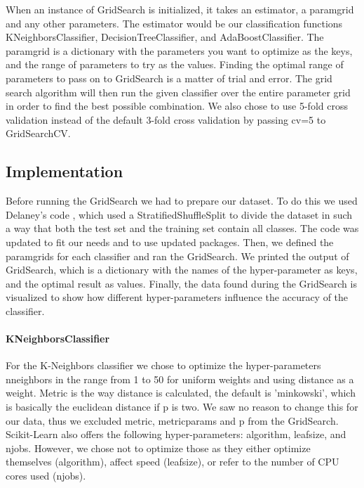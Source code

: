 \documentclass{article}
\begin{document}
	When an instance of GridSearch is initialized, it takes an estimator, a param\textunderscore grid and any other parameters. The estimator would be our classification functions KNeighborsClassifier, DecisionTreeClassifier, and AdaBoostClassifier. The param\textunderscore grid is a dictionary with the parameters you want to optimize as the keys, and the range of parameters to try as the values. Finding the optimal range of parameters to pass on to GridSearch is a matter of trial and error. The grid search algorithm will then run the given classifier over the entire parameter grid in order to find the best possible combination. We also chose to use 5-fold cross validation instead of the default 3-fold cross validation by passing cv=5 to GridSearchCV. 

	\subsection{Implementation}
		Before running the GridSearch we had to prepare our dataset. To do this we used Delaney's code \cite{showdown}, which used a StratifiedShuffleSplit to divide the dataset in such a way that both the test set and the training set contain all classes.  The code was updated to fit our needs and to use updated packages. Then, we defined the param\textunderscore grids for each classifier and ran the GridSearch. We printed the output of GridSearch, which is  a dictionary with the names of the hyper-parameter as keys, and the optimal result as values.  Finally, the data found during the GridSearch is visualized to show how different hyper-parameters influence the accuracy of the classifier.
		\paragraph{KNeighborsClassifier}
			For the K-Neighbors classifier we chose to optimize the hyper-parameters n\textunderscore neighbors in the range from 1 to 50 for uniform weights and using distance as a weight. Metric is the way distance is calculated, the default is 'minkowski', which is basically the euclidean distance if p is two. We saw no reason to change this for our data, thus we excluded metric, metric\textunderscore params and p from the GridSearch. Scikit-Learn also offers the following hyper-parameters: algorithm, leaf\textunderscore size, and n\textunderscore jobs. However, we chose not to optimize those as they either optimize themselves (algorithm), affect speed (leaf\textunderscore size), or refer to the number of CPU cores used (n\textunderscore jobs). 
			
\end{document}
